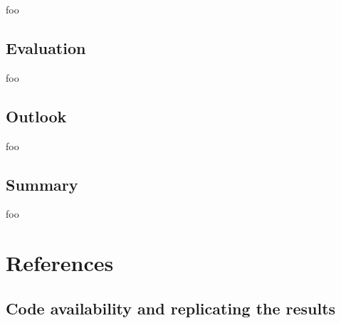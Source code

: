 \documentclass[letter,12pt,notitlepage]{article}
\begin{document}
foo

\subsection{Evaluation}

foo

\subsection{Outlook}

foo

\subsection{Summary}

foo

\vfill
\clearpage %

\section{References}
\printbibliography[heading=none]

\vfill
\clearpage %

\begin{appendices}

\section{Code availability and replicating the results}
\label{appendix:coderesultsrepro}

\end{appendices}
\end{document}
